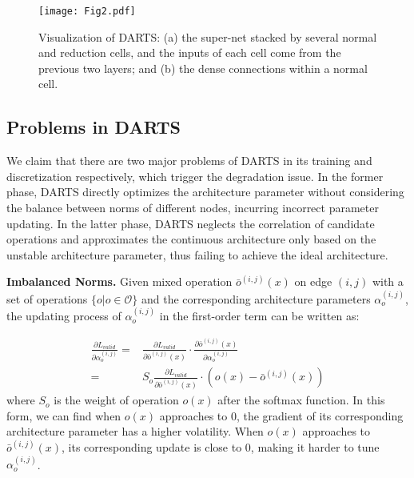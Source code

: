 \documentclass[journal]{IEEEtran}
\begin{document}
\begin{figure}[!htb]
\begin{center}
\end{center}
	\texttt{[image: Fig2.pdf]}
   \caption{Visualization of DARTS: (a) the super-net stacked by several normal and reduction cells, and the inputs of each cell come from the previous two layers; and (b) the dense connections within a normal cell.}
\label{fig:darts}
\end{figure} 

\subsection{Problems in DARTS}
We claim that there are two major problems of DARTS in its training and discretization respectively, which trigger the degradation issue. In the former phase, DARTS directly optimizes the architecture parameter without considering the balance between norms of different nodes, incurring incorrect parameter updating. In the latter phase, DARTS neglects the correlation of candidate operations and  approximates the continuous architecture only based on the unstable architecture parameter, thus failing to achieve the ideal architecture.



\textbf{Imbalanced Norms.} Given mixed operation $\bar{o}^{(i,j)}(x)$ on edge $(i,j)$ with a set of operations $\{o|o\in \mathcal{O}\}$ and the corresponding architecture parameters $\alpha_o^{(i,j)}$, the updating process of $\alpha_o^{(i,j)}$ in the first-order term can be written as:

\begin{equation}
\begin{aligned}
\frac{\partial L_{valid}}{\partial \alpha_o^{(i,j)}} = &\frac{\partial L_{valid}}{\partial \bar{o}^{(i,j)}(x)}\cdot
\frac{\partial \bar{o}^{(i,j)}(x)}{\partial \alpha_o^{(i,j)}} \\= &  S_o \frac{\partial L_{valid}}{\partial \bar{o}^{(i,j)}(x)}\cdot (o(x)-\bar{o}^{(i,j)}(x))
\label{Formula.alpha_update}
\end{aligned}
\end{equation}
where $S_o$ is the weight of operation $o(x)$ after the softmax function. In this form, we can find when $o(x)$ approaches to 0, the gradient of its corresponding architecture parameter has a higher volatility. When $o(x)$ approaches to $\bar{o}^{(i,j)}(x)$, its corresponding update is close to 0, making it harder to tune $\alpha_o^{(i,j)}$.
\end{document}
